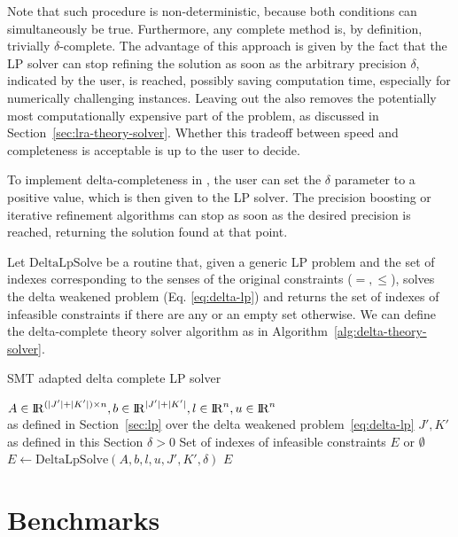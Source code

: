 \documentclass[runningheads]{llncs}
\begin{document}
Note that such procedure is non-deterministic, because both conditions can simultaneously be true.
Furthermore, any complete method is, by definition, trivially $\delta$-complete.
The advantage of this approach is given by the fact that the LP solver can stop refining the solution as soon as the arbitrary precision $\delta$, indicated by the user, is reached, possibly saving computation time, especially for numerically challenging instances.
Leaving out the \nqcs also removes the potentially most computationally expensive part of the problem, as discussed in Section~\ref{sec:lra-theory-solver}.
Whether this tradeoff between speed and completeness is acceptable is up to the user to decide.

To implement delta-completeness in \dlinear, the user can set the $\delta$ parameter to a positive value, which is then given to the LP solver.
The precision boosting or iterative refinement algorithms can stop as soon as the desired precision is reached, returning the solution found at that point.

Let $\text{DeltaLpSolve}$ be a routine that, given a generic LP problem and the set of indexes corresponding to the senses of the original constraints ($=, \le$), solves the delta weakened problem (Eq. \eqref{eq:delta-lp}) and returns the set of indexes of infeasible constraints if there are any or an empty set otherwise.
We can define the delta-complete theory solver algorithm as in Algorithm~\ref{alg:delta-theory-solver}.

\begin{algorithm}
    \caption{SMT adapted delta complete LP solver}\label{alg:delta-theory-solver}
    \begin{algorithmic}
        \Require $A \in {\rm I\!R}^{(|J'| + |K'|) \times n}, b \in {\rm I\!R}^{|J'| + |K'|}, l \in {\rm I\!R}^n, u \in {\rm I\!R}^n$ \\
        \qquad as defined in Section~\ref{sec:lp} over the delta weakened problem~\eqref{eq:delta-lp}
        \Require $J', K'$ as defined in this Section
        \Require $\delta > 0$
        \Ensure Set of indexes of infeasible constraints $E$ or $\emptyset$
        \State $E \gets \text{DeltaLpSolve}(A, b, l, u, J', K', \delta)$ 
        \State \Return $E$
    \end{algorithmic}
\end{algorithm}


\pagebreak

\section{Benchmarks}
\end{document}

